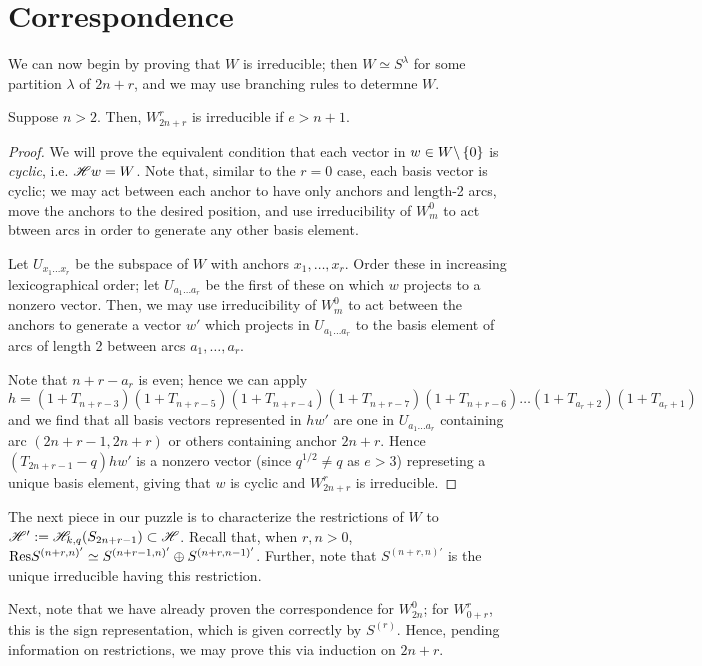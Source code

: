 \documentclass{amsart}
\begin{document}
\section{Correspondence} 
We can now begin by proving that $W$ is irreducible;
then $W \simeq S^\lambda$ for some partition $\lambda$ of $2n + r$, and we may use branching rules to determne $W$.
\begin{proposition}
  Suppose $n > 2$.
  Then, $W_{2n + r}^r$ is irreducible if $e > n + 1$.
\end{proposition}
\begin{proof}
  We will prove the equivalent condition that each vector in $w \in W\backslash \left\{ 0 \right\}$ is \emph{cyclic}, i.e. $\mathscr{H} w = W$.
  Note that, similar to the $r = 0$ case, each basis vector is cyclic;
  we may act between each anchor to have only anchors and length-2 arcs, move the anchors to the desired position, and use irreducibility of $W_{m}^0$ to act btween arcs in order to generate any other basis element.

  Let $U_{x_1\dots x_r}$ be the subspace of $W$ with anchors $x_1,\dots,x_r$.
  Order these in increasing lexicographical order;
  let $U_{a_1\dots a_r}$ be the first of these on which $w$ projects to a nonzero vector.
  Then, we may use irreducibility of $W_{m}^0$ to act between the anchors to generate a vector $w'$ which projects in $U_{a_1\dots a_r}$ to the basis element of arcs of length 2 between arcs $a_1,\dots,a_r$.
   
  Note that $n + r - a_r$ is even;
  hence we can apply
  \[
    h = (1 + T_{n + r - 3})(1 + T_{n+r-5})(1 + T_{n+r-4})(1 + T_{n+r-7})(1 + T_{n+r-6})\dots(1 + T_{a_r +2})(1 + T_{a_r+1})
  \]
  and we find that all basis vectors represented in $hw'$ are one in $U_{a_1\dots a_r}$ containing arc $(2n + r - 1, 2n + r)$ or others containing anchor $2n + r$.
  Hence $(T_{2n + r - 1} - q)hw'$ is a nonzero vector (since $q^{1/2} \neq q$ as $e > 3$) represeting a unique basis element, giving that $w$ is cyclic and $W_{2n + r}^r$ is irreducible.
\end{proof}

The next piece in our puzzle is to characterize the restrictions of $W$ to $\mathscr{H}' := \mathscr{H}_{k,q}(S_{2n + r - 1}) \subset \mathscr{H}$.
Recall that, when $r,n>0$, $\text{Res} S^{(n+r,n)'} \simeq S^{(n+r-1,n)'} \oplus S^{(n+r,n-1)'}$.
Further, note that $S^{(n+r,n)'}$ is the unique irreducible having this restriction.

Next, note that we have already proven the correspondence for $W_{2n}^0$;
for $W_{0 + r}^{r}$, this is the sign representation, which is given correctly by $S^{(r)}$.
Hence, pending information on restrictions, we may prove this via induction on $2n + r$.
\end{document}
